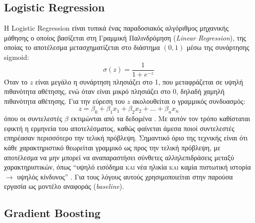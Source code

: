 \subsection{Logistic Regression}
\label{subsec:logistic_regression}

Η Logistic Regression είναι τυπικά ένας παραδοσιακός αλγόριθμος 
μηχανικής μάθησης ο οποίος βασίζεται στη Γραμμική Παλινδρόμηση 
(\textit{Linear Regression}), της οποίας το αποτέλεσμα 
μετασχηματίζεται στο διάστημα $(0,1)$ μέσω της συνάρτησης sigmoid:
\begin{equation}
  \sigma(z) = \frac{1}{1 + e^{-z}}
  \label{eq:sigmoid}
\end{equation}
Όταν το $z$ είναι μεγάλο η συνάρτηση πλησιάζει στο 1, που 
μεταφράζεται σε υψηλή πιθανότητα αθέτησης, ενώ όταν είναι μικρό 
πλησιάζει στο 0, δηλαδή χαμηλή πιθανότητα αθέτησης. Για την εύρεση 
του $z$ ακολουθείται ο γραμμικός συνδυασμός:
\begin{equation}
  z = \beta_0 + \beta_1 x_1 + \beta_2 x_2 + \ldots + \beta_n x_n
  \label{eq:logistic_z}
\end{equation}
όπου οι συντελεστές $\beta$ εκτιμώνται από τα δεδομένα 
\citep{hastie2009}. Με αυτόν τον τρόπο καθίσταται εφικτή η ερμηνεία 
του αποτελέσματος, καθώς φαίνεται άμεσα ποιοί συντελεστές επηρέασαν 
περισσότερο την τελική πρόβλεψη. Σημαντικό όριο της τεχνικής είναι 
ότι κάθε χαρακτηριστικό θεωρείται γραμμικό ως προς την τελική πρόβλεψη, 
με αποτέλεσμα να μην μπορεί να αναπαραστήσει σύνθετες 
αλληλεπιδράσεις μεταξύ χαρακτηριστικών, όπως ``υψηλό εισόδημα 
\textsc{και} νέα ηλικία \textsc{και} καμία πιστωτική ιστορία 
$\rightarrow$ υψηλός κίνδυνος'' \citep{thomas2000}. Για τους λόγους 
αυτούς χρησιμοποιείται στην παρούσα εργασία ως μοντέλο αναφοράς 
(\textit{baseline}).

\subsection{Gradient Boosting}
\label{subsec:gradient_boosting}

